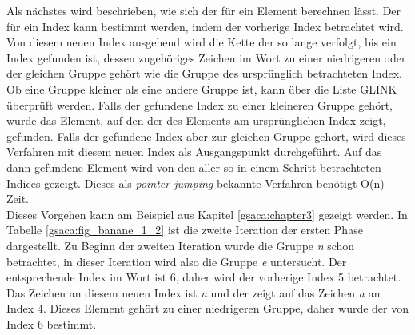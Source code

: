 Als nächstes wird beschrieben, wie sich der \prevpointer für ein Element berechnen lässt. 
Der \prevpointer für ein Index kann bestimmt werden, indem der vorherige Index betrachtet wird. 
Von diesem neuen Index ausgehend wird die Kette der \prevpointer so lange verfolgt, bis ein Index gefunden ist, dessen zugehöriges Zeichen im Wort zu einer niedrigeren oder der gleichen Gruppe gehört wie die Gruppe des ursprünglich betrachteten Index. 
Ob eine Gruppe kleiner als eine andere Gruppe ist, kann über die Liste GLINK überprüft werden. 
Falls der gefundene Index zu einer kleineren Gruppe gehört, wurde das Element, auf den der \prevpointer des Elements am ursprünglichen Index zeigt, gefunden. 
Falls der gefundene Index aber zur gleichen Gruppe gehört, wird dieses Verfahren mit diesem neuen Index als Ausgangspunkt durchgeführt. 
Auf das dann gefundene Element wird von den \prevpointern aller so in einem Schritt betrachteten Indices gezeigt. 
Dieses als \textit{pointer jumping} bekannte Verfahren benötigt O(n) Zeit.\\
Dieses Vorgehen kann am Beispiel aus Kapitel \ref{gsaca:chapter3} gezeigt werden. 
In Tabelle \ref{gsaca:fig_banane_1_2} ist die zweite Iteration der ersten Phase dargestellt. 
Zu Beginn der zweiten Iteration wurde die Gruppe \textit{n} schon betrachtet, in dieser Iteration wird also die Gruppe \textit{e} untersucht. 
Der entsprechende Index im Wort ist 6, daher wird der vorherige Index 5 betrachtet. 
Das Zeichen an diesem neuen Index ist \textit{n} und der \prevpointer zeigt auf das Zeichen \textit{a} an Index 4. 
Dieses Element gehört zu einer niedrigeren Gruppe, daher wurde der \prevpointer von Index 6 bestimmt.\\

